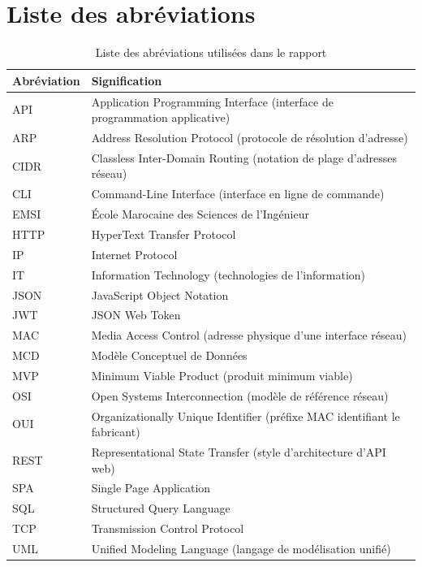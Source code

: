 \chapter*{Liste des abréviations}

\begin{table}[htbp]
    \centering
    \small
    \renewcommand{\arraystretch}{0.92}
    \caption{Liste des abréviations utilisées dans le rapport}
    \label{tab:abreviations}
    \begin{tabular}{@{}>{\raggedright\arraybackslash}p{3cm} >{\raggedright\arraybackslash}p{11cm}@{}}
        \toprule
        \textbf{Abréviation} & \textbf{Signification} \\
        \midrule
        API & Application Programming Interface (interface de programmation applicative) \\
        ARP & Address Resolution Protocol (protocole de résolution d'adresse) \\
        CIDR & Classless Inter-Domain Routing (notation de plage d'adresses réseau) \\
        CLI & Command-Line Interface (interface en ligne de commande) \\
        EMSI & École Marocaine des Sciences de l'Ingénieur \\
        HTTP & HyperText Transfer Protocol \\
        IP & Internet Protocol \\
        IT & Information Technology (technologies de l'information) \\
        JSON & JavaScript Object Notation \\
        JWT & JSON Web Token \\
        MAC & Media Access Control (adresse physique d'une interface réseau) \\
        MCD & Modèle Conceptuel de Données \\
        MVP & Minimum Viable Product (produit minimum viable) \\
        OSI & Open Systems Interconnection (modèle de référence réseau) \\
        OUI & Organizationally Unique Identifier (préfixe MAC identifiant le fabricant) \\
        REST & Representational State Transfer (style d'architecture d'API web) \\
        SPA & Single Page Application \\
        SQL & Structured Query Language \\
        TCP & Transmission Control Protocol \\
        UML & Unified Modeling Language (langage de modélisation unifié) \\
        \bottomrule
    \end{tabular}
\end{table}
